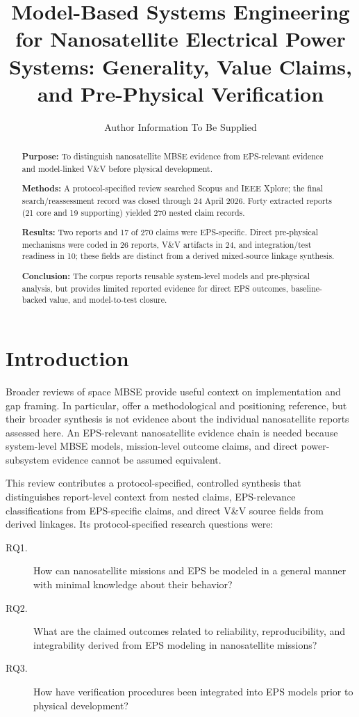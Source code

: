 \documentclass[alpha-refs]{wiley-article}
\title{Model-Based Systems Engineering for Nanosatellite Electrical Power Systems: Generality, Value Claims, and Pre-Physical Verification}
\author[1]{Author Information To Be Supplied}
\affil[1]{Affiliation to be supplied}
\begin{document}
\maketitle

\begin{abstract}
\textbf{Purpose:} To distinguish nanosatellite MBSE evidence from EPS-relevant evidence and model-linked V\&V before physical development.\par
\textbf{Methods:} A protocol-specified review searched Scopus and IEEE Xplore; the final search/reassessment record was closed through 24 April 2026.  Forty extracted reports (21 core and 19 supporting) yielded 270 nested claim records.\par
\textbf{Results:} Two reports and 17 of 270 claims were EPS-specific.  Direct pre-physical mechanisms were coded in 26 reports, V\&V artifacts in 24, and integration/test readiness in 10; these fields are distinct from a derived mixed-source linkage synthesis.\par
\textbf{Conclusion:} The corpus reports reusable system-level models and pre-physical analysis, but provides limited reported evidence for direct EPS outcomes, baseline-backed value, and model-to-test closure.
\end{abstract}
\makeatletter\let\@refundefined\relax\makeatother
{}

\section{Introduction}
Broader reviews of space MBSE provide useful context on implementation and gap framing.  In particular, \citet{Buruso2026MBSESpace} offer a methodological and positioning reference, but their broader synthesis is not evidence about the individual nanosatellite reports assessed here.  An EPS-relevant nanosatellite evidence chain is needed because system-level MBSE models, mission-level outcome claims, and direct power-subsystem evidence cannot be assumed equivalent.

This review contributes a protocol-specified, controlled synthesis that distinguishes report-level context from nested claims, EPS-relevance classifications from EPS-specific claims, and direct V\&V source fields from derived linkages.  Its protocol-specified research questions were:
\begin{description}
\item[RQ1.] How can nanosatellite missions and EPS be modeled in a general manner with minimal knowledge about their behavior?
\item[RQ2.] What are the claimed outcomes related to reliability, reproducibility, and integrability derived from EPS modeling in nanosatellite missions?
\item[RQ3.] How have verification procedures been integrated into EPS models prior to physical development?
\end{description}
\end{document}
